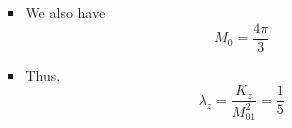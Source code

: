 \documentclass[../notes.tex]{subfiles}
\begin{document}
\begin{itemize}
\begin{itemize}
\begin{itemize}
\begin{equation*}
            \end{equation*}
            \item We also have
            \begin{equation*}
                M_0 = \frac{4\pi}{3}
            \end{equation*}
            \item Thus,
            \begin{equation*}
                \lambda_z = \frac{K_z}{M_01^2}
                = \frac{1}{5}
            \end{equation*}
        \end{itemize}
    \end{itemize}
\end{itemize}
\end{document}
